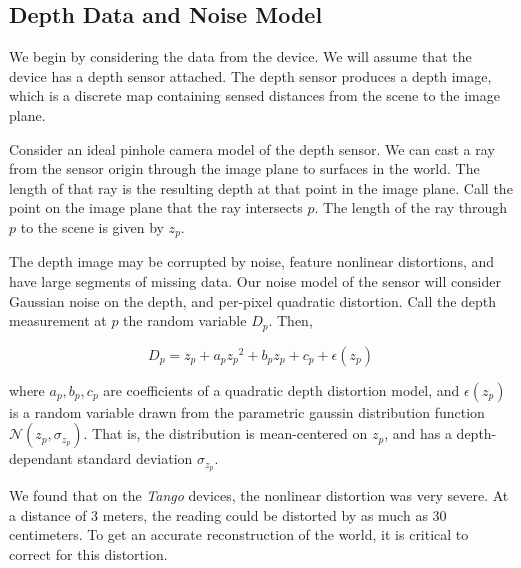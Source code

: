 \subsection{Depth Data and Noise Model}
\label{subsection:calibration}
We begin by considering the data from the device. We will assume that the device
has a depth sensor attached. The depth sensor produces a depth image, which is
a discrete map containing sensed distances from the scene to the image plane.

Consider an ideal pinhole camera model of the depth sensor. We can cast a ray
from the sensor origin through the image plane to surfaces in the world. The
length of that ray is the resulting depth at that point in the image plane. Call
the point on the image plane that the ray intersects $p$. The length of the ray
through $p$ to the scene is given by $z_p$. 

The depth image may be corrupted by noise, feature nonlinear distortions, and
have large segments of missing data. Our noise model of the sensor will consider
Gaussian noise on the depth, and per-pixel quadratic distortion. Call the depth
 measurement at $p$ the random variable $D_p$. Then,
 
 \begin{equation}
 	D_p = z_p + a_p{z_p}^2 + b_p z_p + c_p + \epsilon(z_p)
 \end{equation} 
 
 \noindent where $a_p, b_p, c_p$ are coefficients of a quadratic depth
 distortion model, and $\epsilon(z_p)$ is a random variable drawn from the
 parametric gaussin distribution function $\mathcal{N}(z_p, \sigma_{z_p})$. 
 That is, the distribution is mean-centered on $z_p$, and has a depth-dependant
 standard deviation $\sigma_{z_p}$.
 
 We found that on the \emph{Tango} \cite{Tango} devices, the nonlinear distortion
 was very severe. At a distance of 3 meters, the reading could be distorted by as much as
 30 centimeters. To get an accurate reconstruction of the world, it is critical
 to correct for this distortion.
 
